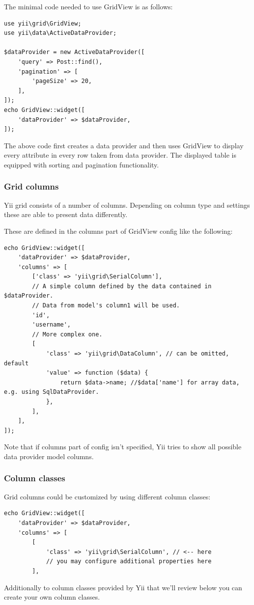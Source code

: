 The minimal code needed to use GridView is as follows:

\lstset{language=php}\begin{lstlisting}
use yii\grid\GridView;
use yii\data\ActiveDataProvider;

$dataProvider = new ActiveDataProvider([
    'query' => Post::find(),
    'pagination' => [
        'pageSize' => 20,
    ],
]);
echo GridView::widget([
    'dataProvider' => $dataProvider,
]);
\end{lstlisting}
The above code first creates a data provider and then uses GridView to display every attribute in every row taken from
data provider. The displayed table is equipped with sorting and pagination functionality.

\subsubsection{Grid columns}
Yii grid consists of a number of columns. Depending on column type and settings these are able to present data differently.

These are defined in the columns part of GridView config like the following:

\lstset{language=php}\begin{lstlisting}
echo GridView::widget([
    'dataProvider' => $dataProvider,
    'columns' => [
        ['class' => 'yii\grid\SerialColumn'],
        // A simple column defined by the data contained in $dataProvider.
        // Data from model's column1 will be used.
        'id',
        'username',
        // More complex one.
        [
            'class' => 'yii\grid\DataColumn', // can be omitted, default
            'value' => function ($data) {
                return $data->name; //$data['name'] for array data, e.g. using SqlDataProvider.
            },
        ],
    ],
]);
\end{lstlisting}
Note that if columns part of config isn't specified, Yii tries to show all possible data provider model columns.

\subsubsection{Column classes}
Grid columns could be customized by using different column classes:

\lstset{language=php}\begin{lstlisting}
echo GridView::widget([
    'dataProvider' => $dataProvider,
    'columns' => [
        [
            'class' => 'yii\grid\SerialColumn', // <-- here
            // you may configure additional properties here
        ],
\end{lstlisting}
Additionally to column classes provided by Yii that we'll review below you can create your own column classes.

